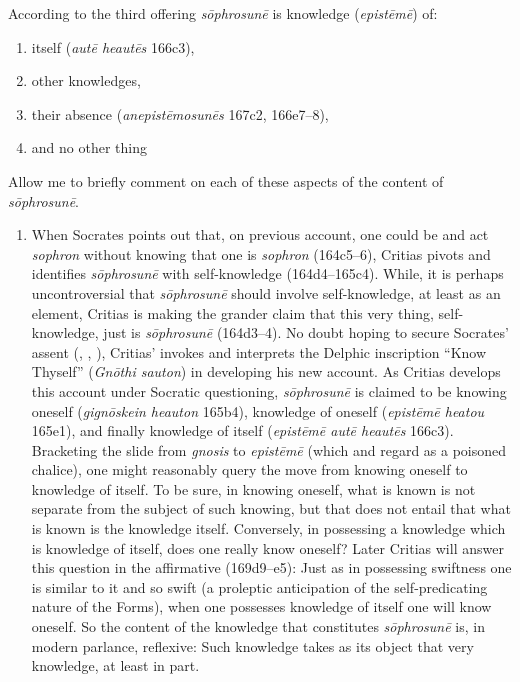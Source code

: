 According to the third offering \emph{sōphrosunē} is knowledge (\emph{epistēmē}) of:
\begin{enumerate}[(1)]
	\item itself (\emph{autē heautēs} 166c3),
	\item other knowledges,
	\item their absence (\emph{anepistēmosunēs} 167c2, 166e7–8),
	\item and no other thing
\end{enumerate}

Allow me to briefly comment on each of these aspects of the content of \emph{sōphrosunē}.
\begin{enumerate}[(1)]
	\item When Socrates points out that, on previous account, one could be and act \emph{sophron} without knowing that one is \emph{sophron} (164c5–6), Critias pivots and identifies \emph{sōphrosunē} with self-knowledge (164d4–165c4). While, it is perhaps uncontroversial that \emph{sōphrosunē} should involve self-knowledge, at least as an element, Critias is making the grander claim that this very thing, self-knowledge, just is \emph{sōphrosunē} (164d3–4). No doubt hoping to secure Socrates' assent (\citealt[23–4]{Tuckey:1951aa}, \citealt[81]{Hyland:1981aa}, \citealt[161–2]{Tsouna:2022aa}), Critias' invokes and interprets the Delphic inscription ``Know Thyself'' (\emph{Gnōthi sauton}) in developing his new account. As Critias develops this account under Socratic questioning, \emph{sōphrosunē} is claimed to be knowing oneself (\emph{gignōskein heauton} 165b4), knowledge of oneself (\emph{epistēmē heatou} 165e1), and finally knowledge of itself (\emph{epistēmē autē heautēs} 166c3). Bracketing the slide from \emph{gnosis} to \emph{epistēmē} (which \citealt{Hyland:1981aa} and \citealt{Schmid:1998aa} regard as a poisoned chalice), one might reasonably query the move from knowing oneself to knowledge of itself. To be sure, in knowing oneself, what is known is not separate from the subject of such knowing, but that does not entail that what is known is the knowledge itself. Conversely, in possessing a knowledge which is knowledge of itself, does one really know oneself? Later Critias will answer this question in the affirmative (169d9–e5): Just as in possessing swiftness one is similar to it and so swift (a proleptic anticipation of the self-predicating nature of the Forms), when one possesses knowledge of itself one will know oneself. So the content of the knowledge that constitutes \emph{sōphrosunē} is, in modern parlance, reflexive: Such knowledge takes as its object that very knowledge, at least in part.

\end{enumerate}
